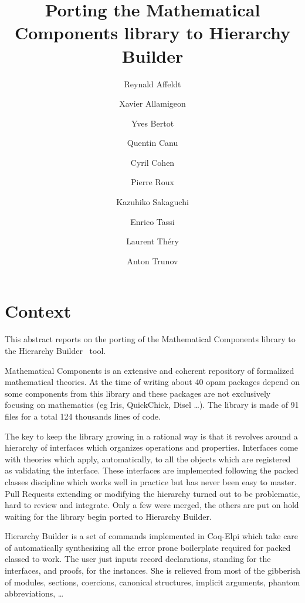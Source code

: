 \documentclass{easychair}
\title{Porting the Mathematical Components library to Hierarchy Builder}
\author{
  Reynald Affeldt\inst{3}
  \and
  Xavier Allamigeon\inst{4}
  \and
  Yves Bertot\inst{1}
  \and
  Quentin Canu
  \and
  Cyril Cohen\inst{1}
  \and
  Pierre Roux
  \and
  Kazuhiko Sakaguchi\inst{2}
  \and
  Enrico Tassi\inst{1}
  \and
  Laurent Th\'ery\inst{1}
  \and
  Anton Trunov
}
\institute{
  Inria, Universit\'e c\^ote d'Azur
\and
   Tsukuba University
\and
   AIST
\and
   Inria, CMAP, CNRS, Ecole Polytechnique, Institut Polytechnique de Paris
 }
\begin{document}
\maketitle



%
%

\section{Context}
\label{sect:introduction}

This abstract reports on the porting of the Mathematical Components library
to the Hierarchy Builder~\cite{cohen_et_al:LIPIcs:2020:12356} tool.

Mathematical Components is an extensive and coherent repository of formalized
mathematical theories. At the time of writing about 40 opam packages depend
on some components from this library and these packages are not exclusively
focusing on mathematics (eg Iris, QuickChick, Disel \ldots). 
The library is made of 91 files for a total 124 thousands lines of code.

The key to keep the library growing in a rational way is that it revolves
around a hierarchy of interfaces which organizes operations and properties.
Interfaces come with theories which apply, automatically, to all the objects
which are registered as validating the interface. These interfaces are
implemented following the packed classes discipline which works well in practice
but has never been easy to master. Pull Requests extending or modifying the
hierarchy turned out to be problematic, hard to review and integrate. Only
a few were merged, the others are put on hold waiting for the library begin
ported to Hierarchy Builder.

Hierarchy Builder is a set of commands implemented in Coq-Elpi which take
care of automatically synthesizing all the error prone boilerplate required for
packed classed to work. The user just inputs record declarations,
standing for the interfaces, and proofs, for the instances. She is relieved from
most of the gibberish of modules, sections, coercions, canonical
structures, implicit arguments, phantom abbreviations, \ldots
 
\end{document}
